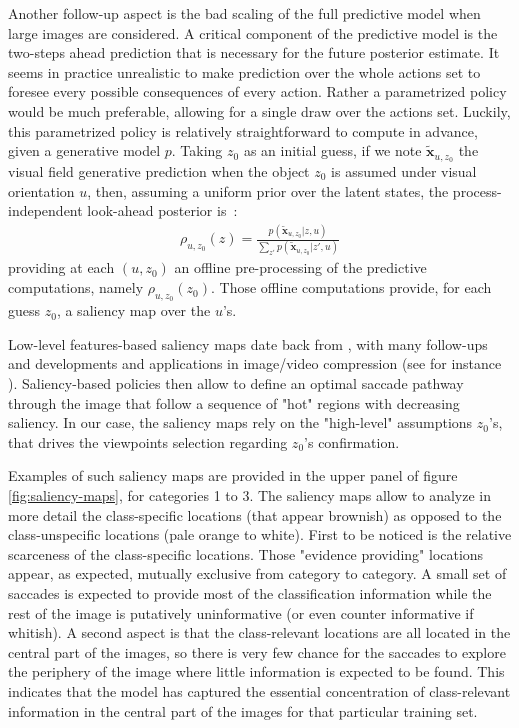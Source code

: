 \documentclass{article} %
\begin{document}
Another follow-up aspect is the bad scaling of the full predictive model when large images are considered. A critical component of the predictive model is the two-steps ahead prediction that is necessary for the future posterior estimate. It seems in practice unrealistic to make prediction over the whole actions set to foresee every possible consequences of every action. Rather a parametrized policy would be much preferable, allowing for a single draw over the actions set.
Luckily, this parametrized policy is relatively straightforward to compute in advance, given a generative model $p$. Taking $z_0$ as an initial guess, if we note $\tilde{\boldsymbol{x}}_{u,z_0}$ the visual field generative prediction when the object $z_0$ is assumed under visual orientation $u$, then, assuming a uniform prior over the latent states, the process-independent look-ahead posterior is~:
\begin{align}
\rho_{u, z_0} (z)=  \frac{p(\tilde{\boldsymbol{x}}_{u, z_0}|z,u)}{\sum_{z'} p(\tilde{\boldsymbol{x}}_{u, z_0}|z',u)}
\end{align}
providing at each $(u, z_0)$ an offline pre-processing of the predictive computations, namely $\rho_{u, z_0}(z_0)$. Those offline computations provide, for each guess $z_0$, a saliency map over the $u$'s. 

Low-level features-based saliency maps date back from \cite{itti2001computational}, with many follow-ups and developments and applications in image/video compression (see for instance \cite{wang2003foveation}). Saliency-based policies then allow to define an optimal saccade pathway through the image that follow a sequence of "hot" regions with decreasing saliency.
In our case, the saliency maps rely on the "high-level" assumptions $z_0$'s, that drives the viewpoints selection regarding $z_0$'s confirmation. 

Examples of such saliency maps are provided in the upper panel of figure \ref{fig:saliency-maps}, for categories 1 to 3. The saliency maps allow to analyze in more detail the class-specific locations (that appear brownish) as opposed to the class-unspecific locations (pale orange to white). First to be noticed is the relative scarceness of the class-specific locations. Those "evidence providing" locations appear, as expected, mutually exclusive from category to category. A small set of saccades is expected to provide most of the classification information while the rest of the image is putatively uninformative (or even counter informative if whitish). A second aspect is that the class-relevant locations are all located in the central part of the images, so there is very few chance for the saccades to explore the periphery of the image where little information is expected to be found. This indicates that the model has captured the essential concentration of class-relevant information in the central part of the images for that particular training set.
\end{document}
